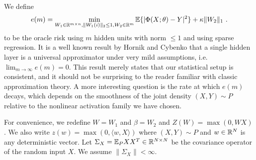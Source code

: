 We define
\begin{equation}
\label{bla2}
e(m) = \min_{W_1 \in {\mathbb{R}}^{m \times n}, \|W_1(i) \|_2 \leq 1, W_2 \in {\mathbb{R}}^m} {\mathbb{E}}\{ | \Phi(X; \theta) - Y|^2 \} + \kappa  \| W_2 \|_1~.
\end{equation}
to be the oracle risk using $m$ hidden units with norm $\leq 1$ and using sparse regression. 
It is a well known result by Hornik and Cybenko that a single hidden layer 
is a universal approximator under very mild assumptions, i.e. $\lim_{m \to \infty} e(m) = 0$.
This result merely states that our statistical setup is consistent, and it should not be 
surprising to the reader familiar with classic approximation theory.
 A more interesting question is the rate at which $e(m)$ decays, which depends 
on the smoothness of the joint density $(X, Y) \sim P$ relative to the nonlinear activation 
family we have chosen.

For convenience, we redefine $W = W_1$ and $\beta = W_2$ and
 $Z(W) = \max(0, W X)$. We also write $z(w) = \max(0, \langle w, X \rangle)$ where $(X, Y) \sim P$ and $w \in {\mathbb{R}}^N$ is any deterministic vector.
Let $\Sigma_X = {\mathbb{E}}_{P} XX^T \in {\mathbb{R}}^{N \times N}$ be the covariance operator of the random input $X$. We assume $\| \Sigma_X \| < \infty$. 

